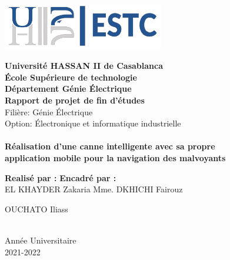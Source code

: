\makeatletter
\begin{titlepage}
\begin{center}
    
\includegraphics[width=7cm]{assets/estc.png}

\textbf{\large{
    Université HASSAN II de Casablanca \\
    École Supérieure de technologie \\
    Département Génie Électrique
}}
\\[4cm]

\textbf{\large{Rapport de projet de fin d'études}} \\[14pt]
Filière: Génie Électrique \\
Option: Électronique et informatique industrielle
\\[2cm]

 \\
\textbf{\large{
Réalisation d'une canne intelligente avec sa propre\\
application mobile pour la navigation des malvoyants
}}


\vfill

\textbf{Realisé par :}
\hfill
\textbf{Encadré par :} \\
EL KHAYDER Zakaria
\hfill
Mme. DKHICHI Fairouz \\
\vspace{-4pt}
\begin{flushleft}
OUCHATO Iliass
\end{flushleft}
\\[1cm]


Année Universitaire \\
2021-2022
\\[24pt]

\end{center}
\end{titlepage}
\makeatother